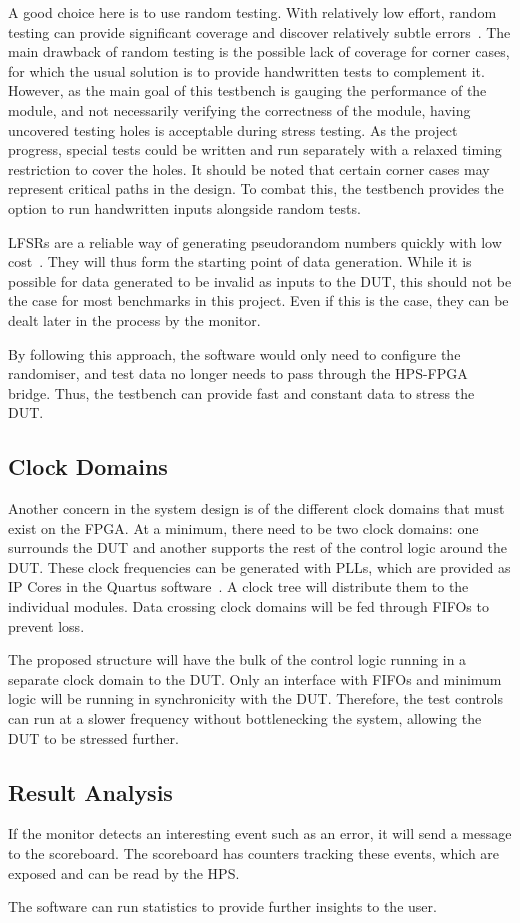 A good choice here is to use random testing.
With relatively low effort, random testing can provide significant coverage
and discover relatively subtle errors~\cite{Duran1}.
The main drawback of random testing is the possible lack of coverage for corner
cases, for which the usual solution is to provide handwritten tests to
complement it.
However, as the main goal of this testbench is gauging the performance of
the module, and not necessarily verifying the correctness of the module,
having uncovered testing holes is acceptable during stress testing.
As the project progress, special tests could be written and run separately
with a relaxed timing restriction to cover the holes.
It should be noted that certain corner cases may represent critical paths in
the design.
To combat this, the testbench provides the option to run handwritten inputs
alongside random tests.

LFSRs are a reliable way of generating pseudorandom numbers quickly with low
cost~\cite{Hazwani1}.
They will thus form the starting point of data generation.
While it is possible for data generated to be invalid as inputs to the DUT, this
should not be the case for most benchmarks in this project.
Even if this is the case, they can be dealt later in the process by the monitor.

By following this approach, the software would only need to configure the
randomiser, and test data no longer needs to pass through the HPS-FPGA bridge.
Thus, the testbench can provide fast and constant data to stress the DUT.

\subsection{Clock Domains}
Another concern in the system design is of the different clock domains that
must exist on the FPGA.
At a minimum, there need to be two clock domains: one surrounds the DUT and
another supports the rest of the control logic around the DUT.
These clock frequencies can be generated with PLLs, which are
provided as IP Cores in the Quartus software~\cite{Altera4}.
A clock tree will distribute them to the individual modules.
Data crossing clock domains will be fed through FIFOs to prevent loss.

The proposed structure will have the bulk of the control logic running
in a separate clock domain to the DUT.
Only an interface with FIFOs and minimum logic will be running in synchronicity
with the DUT.
Therefore, the test controls can run at a slower frequency without
bottlenecking the system, allowing the DUT to be stressed further.

\subsection{Result Analysis}
If the monitor detects an interesting event such as an error, it will send
a message to the scoreboard.
The scoreboard has counters tracking these events, which are exposed and can be
read by the HPS.

The software can run statistics to provide further insights to the user.